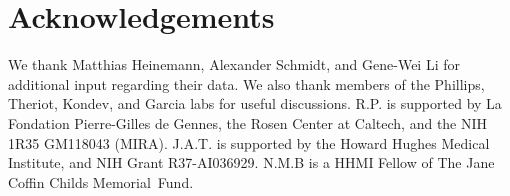 \section{Acknowledgements}
We thank Matthias Heinemann, Alexander Schmidt, and Gene-Wei Li for additional
input regarding their data. We also thank members of the Phillips, Theriot,
Kondev, and Garcia labs for useful discussions. R.P. is supported by La
Fondation Pierre-Gilles de Gennes, the Rosen Center at Caltech, and the NIH 1R35
GM118043 (MIRA). J.A.T. is supported by the Howard Hughes Medical Institute, and
NIH Grant R37-AI036929. N.M.B is a HHMI Fellow of The Jane Coffin Childs Memorial Fund.
